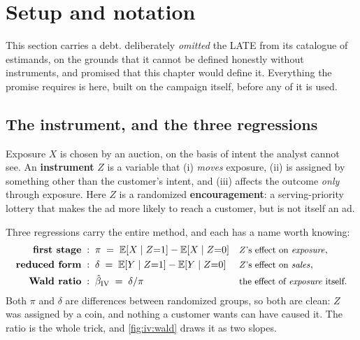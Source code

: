 \section{Setup and notation}
\label{sec:iv:vocab}

This section carries a debt.  deliberately \emph{omitted} the LATE from its
catalogue of estimands, on the grounds that it cannot be defined honestly without instruments, and
promised that this chapter would define it. Everything the promise requires is here, built on the
campaign itself, before any of it is used.

\subsection*{The instrument, and the three regressions}

Exposure $X$ is chosen by an auction, on the basis of intent the analyst cannot see. An
\textbf{instrument} $Z$ is a variable that (i) \emph{moves} exposure, (ii) is assigned by
something other than the customer's intent, and (iii) affects the outcome \emph{only} through
exposure. Here $Z$ is a randomized \textbf{encouragement}: a serving-priority lottery that makes
the ad more likely to reach a customer, but is not itself an ad.

Three regressions carry the entire method, and each has a name worth knowing:
%
\begin{align}
  \text{\textbf{first stage}} \;&:\; \pi \;=\; \operatorname{\mathbb{E}}[X \mid Z{=}1] - \operatorname{\mathbb{E}}[X \mid Z{=}0]
    &&\text{\small $Z$'s effect on \emph{exposure}}, \label{eq:iv:vocab_first}\\
  \text{\textbf{reduced form}} \;&:\; \delta \;=\; \operatorname{\mathbb{E}}[Y \mid Z{=}1] - \operatorname{\mathbb{E}}[Y \mid Z{=}0]
    &&\text{\small $Z$'s effect on \emph{sales}}, \label{eq:iv:vocab_reduced}\\
  \text{\textbf{Wald ratio}} \;&:\; \hat\beta_{\text{IV}} \;=\; \delta / \pi
    &&\text{\small the effect of \emph{exposure} itself}. \label{eq:iv:vocab_wald}
\end{align}
%
Both $\pi$ and $\delta$ are differences between randomized groups, so both are clean: $Z$ was
assigned by a coin, and nothing a customer wants can have caused it. The ratio is the whole trick,
and \cref{fig:iv:wald} draws it as two slopes.

